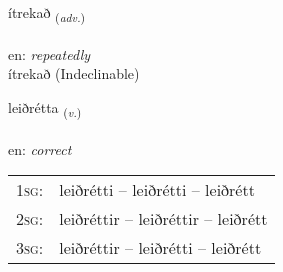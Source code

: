 \documentclass[frontgrid, backgrid]{flacards}\usepackage[]{graphicx}\usepackage[]{xcolor}
\begin{document}

\renewcommand{\flhead}{\vskip5pt \fboxsep=0pt {\small\bfseries\footnotesize Atviksorð | Adverb}}
\renewcommand{\fcfoot}{\vskip5pt \fboxsep=0pt \hspace{2pt}{\small\bfseries\footnotesize 3K}}

\renewcommand{\blhead}{\vskip5pt {\small\bfseries\footnotesize Atviksorð | Adverb }}
\renewcommand{\bcfoot}{\vskip5pt \hspace{2pt}{\small\bfseries\footnotesize 3K}}


{ítrekað \small{\textsubscript{(\textit{adv.})}} \\[1ex]
\textphonetic{[iːtrɛkað]} \\
en: \emph{repeatedly} \\  [2ex]
ítrekað (Indeclinable)}

\renewcommand{\flhead}{\vskip5pt \fboxsep=0pt {\small\bfseries\footnotesize Sagnorð | Verb}}
\renewcommand{\fcfoot}{\vskip5pt \fboxsep=0pt \hspace{2pt}{\small\bfseries\footnotesize 3K}}

\renewcommand{\blhead}{\vskip5pt {\small\bfseries\footnotesize Sagnorð | Verb }}
\renewcommand{\bcfoot}{\vskip5pt \hspace{2pt}{\small\bfseries\footnotesize 3K}}


{leiðrétta \small{\textsubscript{(\textit{v.})}} \\[1ex] %
\textphonetic{[leiðrjɛhta]} \\
en: \emph{correct} \\  [2ex]
\renewcommand*{\arraystretch}{0.8}
\begin{tabular}{p{1cm}l}
\textsc{1sg}: & leiðrétti -- leiðrétti -- leiðrétt \\ 
\textsc{2sg}: & leiðréttir -- leiðréttir -- leiðrétt \\ 
\textsc{3sg}: & leiðréttir -- leiðrétti -- leiðrétt \\ 
\end{tabular}
}
\end{document}
